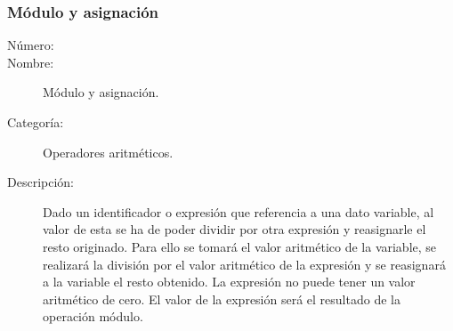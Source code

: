 \subsubsection{Módulo y asignación}
	\begin{description}
		\item [Número:] \cn
		\item [Nombre:] Módulo y asignación.
		\item [Categoría:] Operadores aritméticos.
		\item [Descripción:] Dado un identificador o expresión que referencia a una dato variable, al valor de esta se ha de poder dividir por
		otra expresión y reasignarle el resto originado. Para ello se tomará el valor aritmético de la variable, se realizará la división por el
		valor aritmético de la expresión y se reasignará a la variable el resto obtenido. La expresión no puede tener un valor aritmético de cero.
		El valor de la expresión será el resultado de la operación módulo.
	\end {description}
